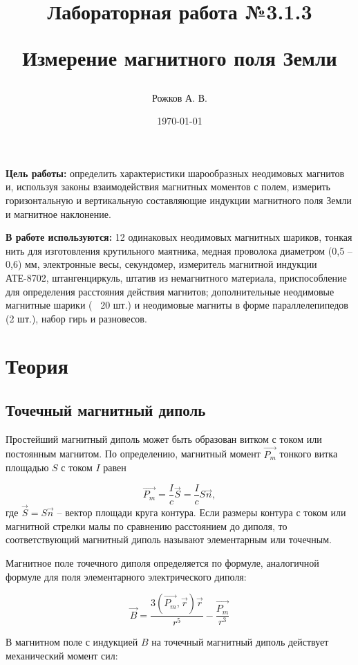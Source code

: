\documentclass[a4paper, 12pt]{article}
\title{\begin{center}Лабораторная работа №3.1.3\end{center}
Измерение магнитного поля Земли}
\author{Рожков А. В.}
\date{\today}
\begin{document}
    \maketitle
    \newpage

    \textbf{Цель работы:} определить характеристики шарообразных неодимовых магнитов и, используя законы взаимодействия магнитных моментов с полем, измерить горизонтальную и вертикальную составляющие индукции магнитного поля Земли и магнитное наклонение.

	\textbf{В работе используются:} 12 одинаковых неодимовых магнитных шариков, тонкая нить для изготовления крутильного маятника, медная проволока диаметром (0,5 – 0,6) мм, электронные весы, секундомер, измеритель магнитной индукции АТЕ-8702, штангенциркуль, штатив из немагнитного материала, приспособление для определения расстояния действия магнитов; дополнительные неодимовые магнитные шарики (~ 20 шт.) и неодимовые магниты в форме параллелепипедов (2 шт.), набор гирь и разновесов.

    \section{Теория}
        \subsection{Точечный магнитный диполь}
            Простейший магнитный диполь может быть образован витком с током или постоянным магнитом. По определению, магнитный момент $\overrightarrow{P_m}$ тонкого витка площадью $S$ с током $I$ равен

            $$
            \overrightarrow{P_m}=\dfrac{I}{c}\vec{S}=\dfrac{I}{c}S\vec{n},
            $$
            где $\vec{S}=S\vec{n}$ -- вектор площади круга контура. Если размеры контура с током или магнитной стрелки малы по сравнению расстоянием до диполя, то соответствующий магнитный диполь называют элементарным или точечным.

            Магнитное поле точечного диполя определяется по формуле, аналогичной формуле для поля элементарного электрического диполя:

            $$
            \vec{B}=\dfrac{3(\overrightarrow{P_m},\vec{r})\vec{r}}{r^5} - \dfrac{\overrightarrow{P_m}}{r^3}
            $$

            В магнитном поле с индукцией $B$ на точечный магнитный диполь действует механический момент сил:
\end{document}
